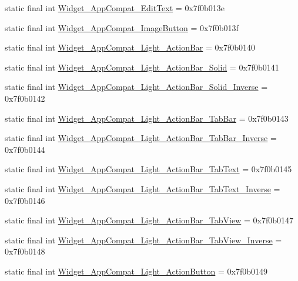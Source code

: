 \begin{CompactItemize}
static final int \hyperlink{classandroid_1_1support_1_1fragment_1_1_r_1_1style_8d714d4be6e8e8c7bc9c1a6724576103}{Widget\_\-AppCompat\_\-EditText} = 0x7f0b013e
\item 
static final int \hyperlink{classandroid_1_1support_1_1fragment_1_1_r_1_1style_9d3f43a3071b498b33e79eea2e1b2527}{Widget\_\-AppCompat\_\-ImageButton} = 0x7f0b013f
\item 
static final int \hyperlink{classandroid_1_1support_1_1fragment_1_1_r_1_1style_3e3c65805418346943242ff3f0c7c0ca}{Widget\_\-AppCompat\_\-Light\_\-ActionBar} = 0x7f0b0140
\item 
static final int \hyperlink{classandroid_1_1support_1_1fragment_1_1_r_1_1style_e756b025470ec64bfa927de6b057a17d}{Widget\_\-AppCompat\_\-Light\_\-ActionBar\_\-Solid} = 0x7f0b0141
\item 
static final int \hyperlink{classandroid_1_1support_1_1fragment_1_1_r_1_1style_57b1f9f63b4606fb54de1665b8ade93b}{Widget\_\-AppCompat\_\-Light\_\-ActionBar\_\-Solid\_\-Inverse} = 0x7f0b0142
\item 
static final int \hyperlink{classandroid_1_1support_1_1fragment_1_1_r_1_1style_1811f6d37830cfb85c0c0db81bc9491e}{Widget\_\-AppCompat\_\-Light\_\-ActionBar\_\-TabBar} = 0x7f0b0143
\item 
static final int \hyperlink{classandroid_1_1support_1_1fragment_1_1_r_1_1style_a9fd17b73aaa7aee699e069436aa9849}{Widget\_\-AppCompat\_\-Light\_\-ActionBar\_\-TabBar\_\-Inverse} = 0x7f0b0144
\item 
static final int \hyperlink{classandroid_1_1support_1_1fragment_1_1_r_1_1style_4f1daab51a80070b45be023040c47754}{Widget\_\-AppCompat\_\-Light\_\-ActionBar\_\-TabText} = 0x7f0b0145
\item 
static final int \hyperlink{classandroid_1_1support_1_1fragment_1_1_r_1_1style_fa2b17ad4084862cf002148b1013e64a}{Widget\_\-AppCompat\_\-Light\_\-ActionBar\_\-TabText\_\-Inverse} = 0x7f0b0146
\item 
static final int \hyperlink{classandroid_1_1support_1_1fragment_1_1_r_1_1style_0fb8bb1d45066d797b071f2add33961d}{Widget\_\-AppCompat\_\-Light\_\-ActionBar\_\-TabView} = 0x7f0b0147
\item 
static final int \hyperlink{classandroid_1_1support_1_1fragment_1_1_r_1_1style_3345db8c7011955fdbaf9e30ae84d11d}{Widget\_\-AppCompat\_\-Light\_\-ActionBar\_\-TabView\_\-Inverse} = 0x7f0b0148
\item 
static final int \hyperlink{classandroid_1_1support_1_1fragment_1_1_r_1_1style_d83a0300f21658810447a27b50803c79}{Widget\_\-AppCompat\_\-Light\_\-ActionButton} = 0x7f0b0149

\end{CompactItemize}

